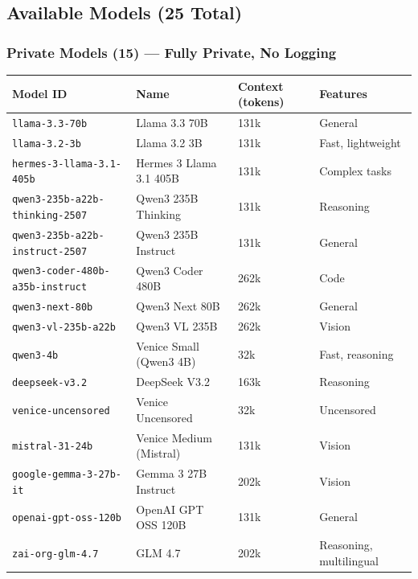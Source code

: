 \subsection{Available Models (25 Total)}


\subsubsection{Private Models (15) — Fully Private, No Logging}



\begin{table}[h]
\centering
\small
\begin{tabular}{|l|l|l|l|}
\hline
Model ID & Name & Context (tokens) & Features \\
\hline
\texttt{llama-3.3-70b} & Llama 3.3 70B & 131k & General \\
\hline
\texttt{llama-3.2-3b} & Llama 3.2 3B & 131k & Fast, lightweight \\
\hline
\texttt{hermes-3-llama-3.1-405b} & Hermes 3 Llama 3.1 405B & 131k & Complex tasks \\
\hline
\texttt{qwen3-235b-a22b-thinking-2507} & Qwen3 235B Thinking & 131k & Reasoning \\
\hline
\texttt{qwen3-235b-a22b-instruct-2507} & Qwen3 235B Instruct & 131k & General \\
\hline
\texttt{qwen3-coder-480b-a35b-instruct} & Qwen3 Coder 480B & 262k & Code \\
\hline
\texttt{qwen3-next-80b} & Qwen3 Next 80B & 262k & General \\
\hline
\texttt{qwen3-vl-235b-a22b} & Qwen3 VL 235B & 262k & Vision \\
\hline
\texttt{qwen3-4b} & Venice Small (Qwen3 4B) & 32k & Fast, reasoning \\
\hline
\texttt{deepseek-v3.2} & DeepSeek V3.2 & 163k & Reasoning \\
\hline
\texttt{venice-uncensored} & Venice Uncensored & 32k & Uncensored \\
\hline
\texttt{mistral-31-24b} & Venice Medium (Mistral) & 131k & Vision \\
\hline
\texttt{google-gemma-3-27b-it} & Gemma 3 27B Instruct & 202k & Vision \\
\hline
\texttt{openai-gpt-oss-120b} & OpenAI GPT OSS 120B & 131k & General \\
\hline
\texttt{zai-org-glm-4.7} & GLM 4.7 & 202k & Reasoning, multilingual \\
\hline
\end{tabular}
\end{table}




